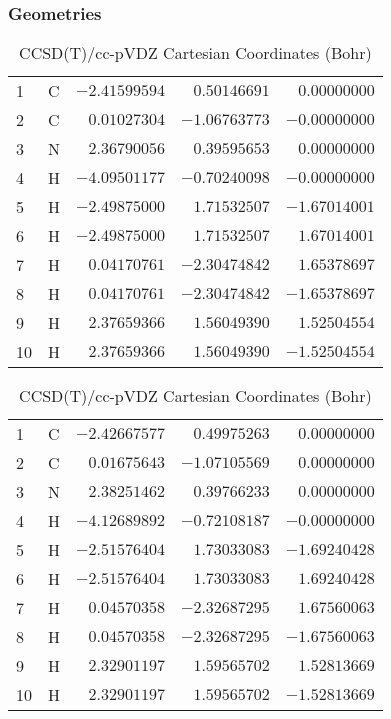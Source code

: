 \documentclass[10pt,oneside]{article}
\begin{document}
\begin{table}[h!]
\subsubsection*{Geometries}
\begin{multicols}{2}
\centering
\caption{CCSD(T)/cc-pVTZ Cartesian Coordinates (Bohr)}
\begin{tabular}{llrrr}
\toprule
1  & C  & $-2.41599594$ & $ 0.50146691$ & $ 0.00000000$ \\
2  & C  & $ 0.01027304$ & $-1.06763773$ & $-0.00000000$ \\
3  & N  & $ 2.36790056$ & $ 0.39595653$ & $ 0.00000000$ \\
4  & H  & $-4.09501177$ & $-0.70240098$ & $-0.00000000$ \\
5  & H  & $-2.49875000$ & $ 1.71532507$ & $-1.67014001$ \\
6  & H  & $-2.49875000$ & $ 1.71532507$ & $ 1.67014001$ \\
7  & H  & $ 0.04170761$ & $-2.30474842$ & $ 1.65378697$ \\
8  & H  & $ 0.04170761$ & $-2.30474842$ & $-1.65378697$ \\
9  & H  & $ 2.37659366$ & $ 1.56049390$ & $ 1.52504554$ \\
10 & H  & $ 2.37659366$ & $ 1.56049390$ & $-1.52504554$ \\
\bottomrule
\end{tabular}
\caption{CCSD(T)/cc-pVDZ Cartesian Coordinates (Bohr)}
\begin{tabular}{llrrr}
\toprule
1  & C  & $-2.42667577$ & $ 0.49975263$ & $ 0.00000000$ \\
2  & C  & $ 0.01675643$ & $-1.07105569$ & $ 0.00000000$ \\
3  & N  & $ 2.38251462$ & $ 0.39766233$ & $ 0.00000000$ \\
4  & H  & $-4.12689892$ & $-0.72108187$ & $-0.00000000$ \\
5  & H  & $-2.51576404$ & $ 1.73033083$ & $-1.69240428$ \\
6  & H  & $-2.51576404$ & $ 1.73033083$ & $ 1.69240428$ \\
7  & H  & $ 0.04570358$ & $-2.32687295$ & $ 1.67560063$ \\
8  & H  & $ 0.04570358$ & $-2.32687295$ & $-1.67560063$ \\
9  & H  & $ 2.32901197$ & $ 1.59565702$ & $ 1.52813669$ \\
10 & H  & $ 2.32901197$ & $ 1.59565702$ & $-1.52813669$ \\
\bottomrule
\end{tabular}
\end{multicols}
\end{table}
\end{document}
